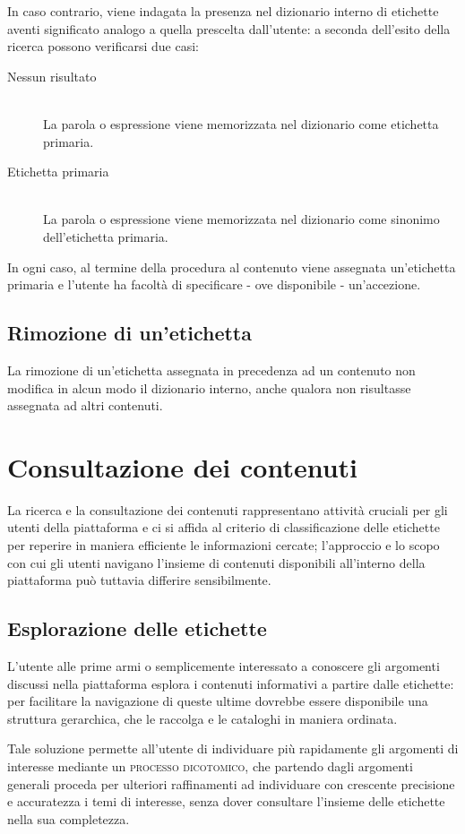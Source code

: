 \documentclass[10pt,a4paper,headinclude,footinclude,hidelinks]{scrreprt} %
\begin{document}
	In caso contrario, viene indagata la presenza nel dizionario interno di etichette aventi significato analogo a quella prescelta dall'utente: a seconda dell'esito della ricerca possono verificarsi due casi:
	\begin{description}
	\item[Nessun risultato] \hfill \\
	La parola o espressione viene memorizzata nel dizionario come etichetta primaria.
	\item[Etichetta primaria] \hfill \\
	La parola o espressione viene memorizzata nel dizionario come sinonimo dell'etichetta primaria.
	\end{description}

	In ogni caso, al termine della procedura al contenuto viene assegnata un'etichetta primaria e l'utente ha facoltà di specificare - ove disponibile - un'accezione.
	\subsection{Rimozione di un'etichetta}
	La rimozione di un'etichetta assegnata in precedenza ad un contenuto non modifica in alcun modo il dizionario interno, anche qualora non risultasse assegnata ad altri contenuti.

	\section{Consultazione dei contenuti}
	\label{sec:stage:cls:scenari:read}
	La ricerca e la consultazione dei contenuti rappresentano attività cruciali per gli utenti della piattaforma e ci si affida al criterio di classificazione delle etichette per reperire in maniera efficiente le informazioni cercate; l'approccio e lo scopo con cui gli utenti navigano l'insieme di contenuti disponibili all'interno della piattaforma può tuttavia differire sensibilmente.
	\subsection{Esplorazione delle etichette}
	L'utente alle prime armi o semplicemente interessato a conoscere gli argomenti discussi nella piattaforma esplora i contenuti informativi a partire dalle etichette: per facilitare la navigazione di queste ultime dovrebbe essere disponibile una struttura gerarchica, che le raccolga e le cataloghi in maniera ordinata.

	Tale soluzione permette all'utente di individuare più rapidamente gli argomenti di interesse mediante un \textsc{processo dicotomico}, che partendo dagli argomenti generali proceda per ulteriori raffinamenti ad individuare con crescente precisione e accuratezza i temi di interesse, senza dover consultare l'insieme delle etichette nella sua completezza.
\end{document}
